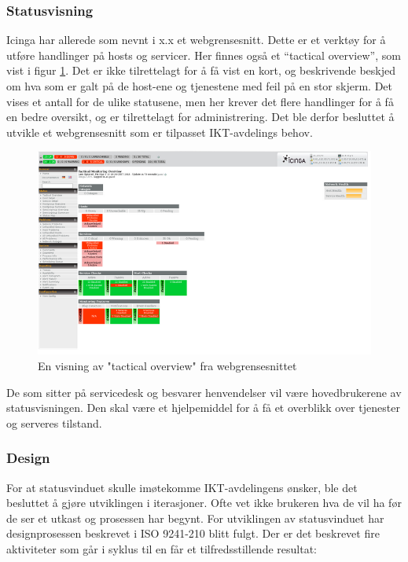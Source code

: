 \subsubsection{Statusvisning}

Icinga har allerede som nevnt i x.x et webgrensesnitt. Dette er et verktøy for å utføre handlinger på hosts og servicer. Her finnes også et “tactical overview”, som vist i figur \ref{icingawebgui}. Det er ikke tilrettelagt for å få vist en kort, og beskrivende beskjed om hva som er galt på de host-ene og tjenestene med feil på en stor skjerm. Det vises et antall for de ulike statusene, men her krever det flere handlinger for å få en bedre oversikt, og er tilrettelagt for administrering. Det ble derfor besluttet å utvikle et webgrensesnitt som er tilpasset IKT-avdelings behov.

\begin{figure}[H]
    \centering
    \includegraphics[scale=0.6]{img/icinga_tactical}
    \caption{En visning av "tactical overview" fra webgrensesnittet}
    \label{icingawebgui}
\end{figure}


De som sitter på servicedesk og besvarer henvendelser vil være hovedbrukerene av statusvisningen. Den skal være et hjelpemiddel for å få et overblikk over tjenester og serveres tilstand.

\subsubsection{Design}

For at statusvinduet skulle imøtekomme IKT-avdelingens ønsker, ble det besluttet å gjøre utviklingen i iterasjoner. Ofte vet ikke brukeren hva de vil ha før de ser et utkast og prosessen har begynt. For utviklingen av statusvinduet har designprosessen beskrevet i ISO 9241-210 blitt fulgt. Der er det beskrevet fire aktiviteter som går i syklus til en får et tilfredsstillende resultat:

